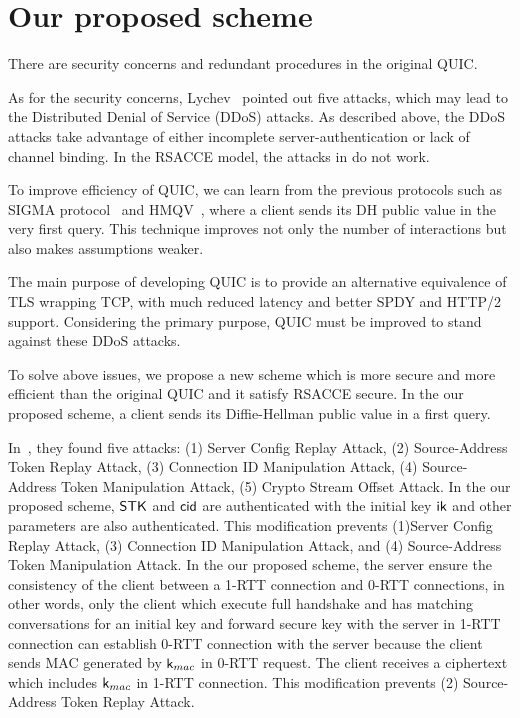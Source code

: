 \section{Our proposed scheme} \label{sec:proposed_scheme}

There are security concerns and redundant procedures in the original
QUIC.

As for the security concerns, 
Lychev~\cite{LJBN15:QUIC} pointed out five attacks, 
which may lead to the Distributed Denial of Service (DDoS) attacks.
As described above, 
the DDoS attacks take advantage of either incomplete server-authentication or 
lack of channel binding. 
In the RSACCE model, the attacks in \cite{LJBN15:QUIC} do not work. 

To improve efficiency of QUIC, we can learn from 
the previous protocols such as SIGMA protocol~\cite{Kra03:SIGMA} and HMQV~\cite{Kra05:HQMV}, 
where a client sends its DH public value in the very first query. 
This technique improves not only the number of interactions 
but also makes assumptions weaker.

The main purpose of developing QUIC is to provide an 
alternative equivalence of TLS wrapping TCP, with much
reduced latency and better SPDY and HTTP/2 support. 
Considering the primary purpose, QUIC must be improved to stand against these DDoS attacks. 
\fi

To solve above issues, we propose a new scheme which is more secure and more efficient
than the original QUIC and it satisfy RSACCE secure.
In the our proposed scheme, a client sends its Diffie-Hellman public value in
a first query.
\fi

In~\cite{LJBN15:QUIC}, they found five attacks:
(1) Server Config Replay Attack,
(2) Source-Address Token Replay Attack,
(3) Connection ID Manipulation Attack,
(4) Source-Address Token Manipulation Attack,
(5) Crypto Stream Offset Attack.
In the our proposed scheme, $\mathsf{STK}$ and $\mathsf{cid}$ are authenticated with the initial key
$\mathsf{ik}$ and other parameters are also authenticated.
This modification prevents (1)Server Config Replay Attack,
(3) Connection ID Manipulation Attack, and
(4) Source-Address Token Manipulation Attack.
In the our proposed scheme, the server ensure the consistency of the client between
a 1-RTT connection and 0-RTT connections, in other words, only the client which
execute full handshake and has matching conversations for an initial key and forward
secure key with the server in 1-RTT connection can establish 0-RTT connection with
the server because the client sends MAC generated by $\mathsf{k}_{mac}$ in 0-RTT request.
The client receives a ciphertext which includes $\mathsf{k}_{mac}$ in 1-RTT connection.
This modification prevents (2) Source-Address Token Replay Attack.
\fi
